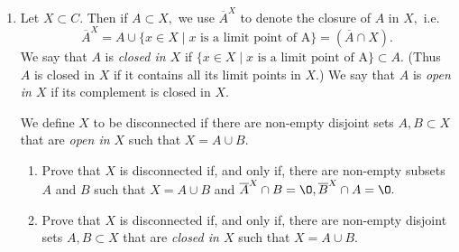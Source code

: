 \documentclass[11pt]{article}
\renewcommand{\emptyset}{\O}
\renewcommand{\_}[1]{\underline{ #1 }}
\theoremstyle{definition}
\numberwithin{equation}{subsection}
\begin{document}
\begin{enumerate}
\item Let $X\subset C.$ Then if $A\subset X,$ we use $\overline{A}^X$ to denote the closure of $A$ in $X,$ i.e. $$\overline{A}^X=A\cup\{x\in X\mid x \text{ is a limit point of A}\}=(\overline{A}\cap X).$$ We say that $A$ is {\it closed  in $X$} if $\{x\in X\mid x\text{ is a limit point of A}\}\subset A.$ (Thus $A $ is closed in $X$ if it contains all its limit points in $X.$)
We say that $A$ is {\it open in $X$} if its complement is closed in $X.$

 

  We define $X$ to be disconnected if there are non-empty disjoint sets $A,B\subset X$ that are {\it open in $X$} such that $X=A\cup B.$
  \begin{enumerate}
  \item
  Prove that  $X$ is disconnected if, and only if,  there are non-empty subsets $A$ and $B$ such that $X=A\cup B$ and $\overline{A}^X\cap B=\emptyset, \overline{B}^X\cap A=\emptyset.$
  \item 
 Prove that $X$ is disconnected if, and only if, there are non-empty disjoint sets $A,B\subset X$ that are {\it closed in $X$} such that $X=A\cup B.$
 \end{enumerate}
  


\end{enumerate}
\end{document}
